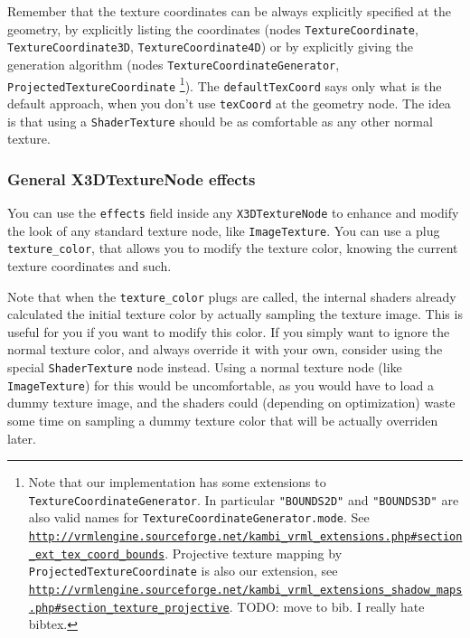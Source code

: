 \documentclass{acmsiggraph}                     %
\newcommand*{\myhref}[2]{\texttt{\href{#1}{\nolinkurl{#2}}}}
\begin{document}
Remember that the texture coordinates can be always explicitly specified
at the geometry, by explicitly listing the coordinates (nodes
\texttt{TextureCoordinate}, \texttt{TextureCoordinate3D},
\texttt{TextureCoordinate4D}) or by explicitly giving the generation
algorithm (nodes \texttt{TextureCoordinateGenerator},
\texttt{ProjectedTextureCoordinate} \footnote{
    Note that our implementation has some extensions
    to \texttt{TextureCoordinateGenerator}. In particular
    \texttt{"BOUNDS2D"} and \texttt{"BOUNDS3D"} are also valid names for
    \texttt{TextureCoordinateGenerator.mode}. See
    \myhref{http://vrmlengine.sourceforge.net/kambi\_vrml\_extensions.php\#section\_ext\_tex\_coord\_bounds}{http://vrmlengine.sourceforge.net/kambi_vrml_extensions.php\#section_ext_tex_coord_bounds}.
    Projective texture mapping by \texttt{ProjectedTextureCoordinate}
    is also our extension, see
    \myhref{http://vrmlengine.sourceforge.net/kambi\_vrml\_extensions\_shadow\_maps.php\#section\_texture\_projective}{http://vrmlengine.sourceforge.net/kambi_vrml_extensions_shadow_maps.php\#section_texture_projective}.
    TODO: move to bib. I really hate bibtex.
}).
The \texttt{defaultTexCoord} says only what is the default approach,
when you don't use \texttt{texCoord} at the geometry node.
The idea is that using a \texttt{ShaderTexture} should be as comfortable
as any other normal texture.

\subsubsection{General X3DTextureNode effects}

You can use the \texttt{effects} field
inside any \texttt{X3DTextureNode} to enhance and modify the look of any
standard texture node, like \texttt{ImageTexture}.
You can use a plug \texttt{texture\_color},
that allows you to modify the texture color, knowing the current texture
coordinates and such.

Note that when the \texttt{texture\_color} plugs are called,
the internal shaders already calculated the initial texture
color by actually sampling the texture image. This is useful for you if you
want to modify this color. If you simply want to ignore the normal
texture color, and always override it with your own, consider using
the special \texttt{ShaderTexture} node instead. Using
a normal texture node (like \texttt{ImageTexture}) for this
would be uncomfortable, as you would have to load a dummy texture image,
and the shaders could (depending on optimization) waste some time
on sampling a dummy texture color that will be actually overriden later.
\end{document}
